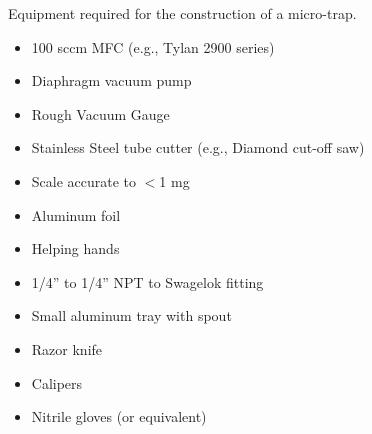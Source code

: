 \begin{table}[H]
    \caption{Equipment required for the construction of a micro-trap.}
    \begin{multicols}{2}
        \begin{itemize}
            \itemsep0em
            \item 100 sccm MFC (e.g., Tylan 2900 series)
            \item Diaphragm vacuum pump
            \item Rough Vacuum Gauge
            \item Stainless Steel tube cutter (e.g., Diamond cut-off saw)
            \item Scale accurate to $<$1 mg
            \item Aluminum foil
            \item Helping hands
            \item 1/4'' to 1/4'' NPT to Swagelok fitting
            \item Small aluminum tray with spout
            \item Razor knife
            \item Calipers
            \item Nitrile gloves (or equivalent)
        \end{itemize}
    \end{multicols}
    \label{tab:adsorbent trap construction equipment}
\end{table}

